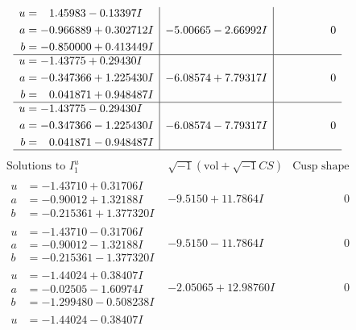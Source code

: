 \documentclass[1p]{elsarticle_modified}
\theoremstyle{definition}
\newcommand{\I}{\sqrt{-1}}
\begin{document}
$$\begin{array}{c|c|c}
\begin{aligned}
u &= \phantom{-}1.45983 - 0.13397 I \\
a &= -0.966889 + 0.302712 I \\
b &= -0.850000 + 0.413449 I\end{aligned}
 & -5.00665 - 2.66992 I & \phantom{-0.000000 } 0 \\ \hline\begin{aligned}
u &= -1.43775 + 0.29430 I \\
a &= -0.347366 + 1.225430 I \\
b &= \phantom{-}0.041871 + 0.948487 I\end{aligned}
 & -6.08574 + 7.79317 I & \phantom{-0.000000 } 0 \\ \hline\begin{aligned}
u &= -1.43775 - 0.29430 I \\
a &= -0.347366 - 1.225430 I \\
b &= \phantom{-}0.041871 - 0.948487 I\end{aligned}
 & -6.08574 - 7.79317 I & \phantom{-0.000000 } 0\\
 \hline 
 \end{array}$$\newpage$$\begin{array}{c|c|c}  
\text{Solutions to }I^u_{1}& \I (\text{vol} + \sqrt{-1}CS) & \text{Cusp shape}\\
 \hline 
\begin{aligned}
u &= -1.43710 + 0.31706 I \\
a &= -0.90012 + 1.32188 I \\
b &= -0.215361 + 1.377320 I\end{aligned}
 & -9.5150 + 11.7864 I & \phantom{-0.000000 } 0 \\ \hline\begin{aligned}
u &= -1.43710 - 0.31706 I \\
a &= -0.90012 - 1.32188 I \\
b &= -0.215361 - 1.377320 I\end{aligned}
 & -9.5150 - 11.7864 I & \phantom{-0.000000 } 0 \\ \hline\begin{aligned}
u &= -1.44024 + 0.38407 I \\
a &= -0.02505 - 1.60974 I \\
b &= -1.299480 - 0.508238 I\end{aligned}
 & -2.05065 + 12.98760 I & \phantom{-0.000000 } 0 \\ \hline\begin{aligned}
u &= -1.44024 - 0.38407 I \\

\end{aligned}
\end{array}$$
\end{document}

